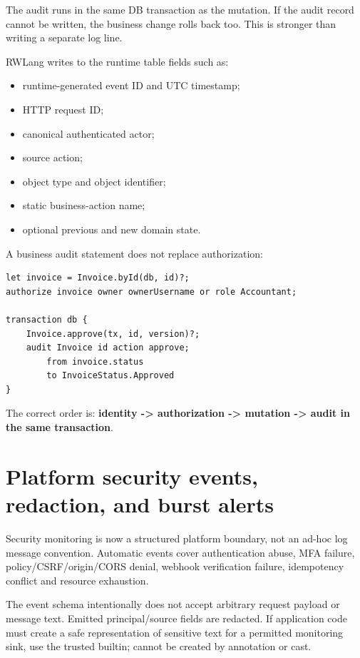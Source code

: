 The audit runs in the same DB transaction as the mutation. If the audit record cannot be written, the business change rolls back too. This is stronger than writing a separate log line.

RWLang writes to the  runtime table fields such as:

\begin{itemize}
  \item runtime-generated event ID and UTC timestamp;
  \item HTTP request ID;
  \item canonical authenticated actor;
  \item source action;
  \item object type and object identifier;
  \item static business-action name;
  \item optional previous and new domain state.
\end{itemize}

\Needspace{0.30\textheight}
A business audit statement does not replace authorization:

\begin{lstlisting}[language=RWLang]
let invoice = Invoice.byId(db, id)?;
authorize invoice owner ownerUsername or role Accountant;

transaction db {
    Invoice.approve(tx, id, version)?;
    audit Invoice id action approve;
        from invoice.status
        to InvoiceStatus.Approved
}
\end{lstlisting}

The correct order is: \textbf{identity -> authorization -> mutation -> audit in the same transaction}.

\section{Platform security events, redaction, and burst alerts}

Security monitoring is now a structured platform boundary, not an ad-hoc log message convention. Automatic events cover authentication abuse, MFA failure, policy/CSRF/origin/CORS denial, webhook verification failure, idempotency conflict and resource exhaustion.

The event schema intentionally does not accept arbitrary request payload or message text. Emitted principal/source fields are redacted. If application code must create a safe representation of sensitive text for a permitted monitoring sink, use the trusted  builtin;  cannot be created by annotation or cast.

